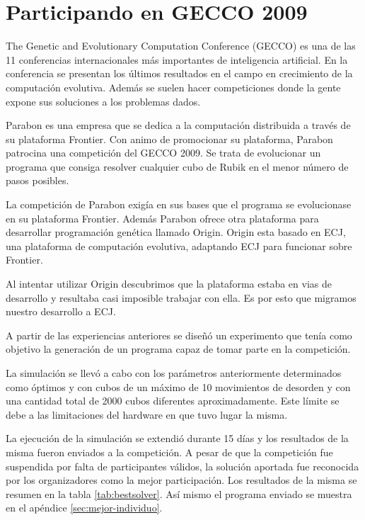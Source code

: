 \chapter{Participando en GECCO 2009}\label{ch:gecco2009}

The Genetic and Evolutionary Computation Conference (GECCO) es una de las 11
conferencias internacionales más importantes de inteligencia
artificial. En la conferencia se presentan los últimos resultados en el campo
en crecimiento de la computación evolutiva. Además se suelen hacer
competiciones donde la gente expone sus soluciones a los problemas dados.

Parabon es una empresa que se dedica a la computación distribuida a través de
su plataforma Frontier. Con animo de promocionar su plataforma, Parabon
patrocina una competición del GECCO 2009. Se trata de evolucionar un programa
que consiga resolver cualquier cubo de Rubik en el menor número de pasos
posibles.

La competición de Parabon exigía en sus bases que el programa se evolucionase
en su plataforma Frontier. Además Parabon ofrece otra plataforma para
desarrollar programación genética llamado Origin. Origin esta basado en ECJ,
una plataforma de computación evolutiva, adaptando ECJ para funcionar sobre
Frontier.

Al intentar utilizar Origin descubrimos que la plataforma estaba en vias de
desarrollo y resultaba casi imposible trabajar con ella. Es por esto que
migramos nuestro desarrollo a ECJ.

A partir de las experiencias anteriores se diseñó un experimento que tenía como
objetivo la generación de un programa capaz de tomar parte en la competición.

La simulación se llevó a cabo con los parámetros anteriormente determinados como
óptimos y con cubos de un máximo de 10 movimientos de desorden y con una cantidad
total de 2000 cubos diferentes aproximadamente. Este límite se debe a las
limitaciones del hardware en que tuvo lugar la misma.

La ejecución de la simulación se extendió durante 15 días y los resultados de la
misma fueron enviados a la competición. A pesar de que la competición fue
suspendida por falta de participantes válidos, la solución aportada fue
reconocida por los organizadores como la mejor participación. Los resultados de
la misma se resumen en la tabla \ref{tab:bestsolver}. Así mismo el programa
enviado se muestra en el apéndice \ref{sec:mejor-individuo}.



